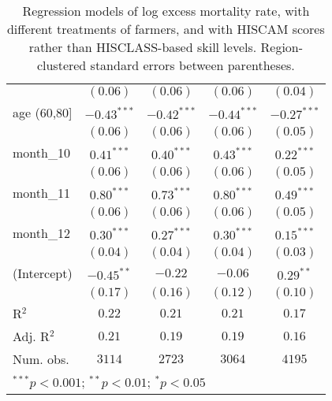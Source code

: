 \begin{table}
\begin{center}
\begin{tabular}{l c c c c}
               & $(0.06)$      & $(0.06)$      & $(0.06)$      & $(0.04)$      \\
age (60,80]    & $-0.43^{***}$ & $-0.42^{***}$ & $-0.44^{***}$ & $-0.27^{***}$ \\
               & $(0.06)$      & $(0.06)$      & $(0.06)$      & $(0.05)$      \\
month\_10      & $0.41^{***}$  & $0.40^{***}$  & $0.43^{***}$  & $0.22^{***}$  \\
               & $(0.06)$      & $(0.06)$      & $(0.06)$      & $(0.05)$      \\
month\_11      & $0.80^{***}$  & $0.73^{***}$  & $0.80^{***}$  & $0.49^{***}$  \\
               & $(0.06)$      & $(0.06)$      & $(0.06)$      & $(0.05)$      \\
month\_12      & $0.30^{***}$  & $0.27^{***}$  & $0.30^{***}$  & $0.15^{***}$  \\
               & $(0.04)$      & $(0.04)$      & $(0.04)$      & $(0.03)$      \\
(Intercept)    & $-0.45^{**}$  & $-0.22$       & $-0.06$       & $0.29^{**}$   \\
               & $(0.17)$      & $(0.16)$      & $(0.12)$      & $(0.10)$      \\
\hline
R$^2$          & $0.22$        & $0.21$        & $0.21$        & $0.17$        \\
Adj. R$^2$     & $0.21$        & $0.19$        & $0.19$        & $0.16$        \\
Num. obs.      & $3114$        & $2723$        & $3064$        & $4195$        \\
\hline
\multicolumn{5}{l}{\scriptsize{$^{***}p<0.001$; $^{**}p<0.01$; $^{*}p<0.05$}}
\end{tabular}
\caption{Regression models of log excess mortality rate, with different treatments of farmers, and with HISCAM scores rather than HISCLASS-based skill levels. Region-clustered standard errors between parentheses.}
\label{tab:altoccmodels}
\end{center}
\end{table}
